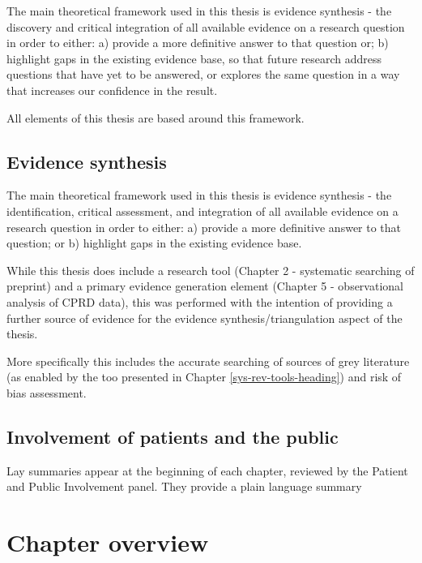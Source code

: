 \documentclass[a4paper, twoside]{templates/ociamthesis}
\begin{document}
The main theoretical framework used in this thesis is evidence synthesis - the discovery and critical integration of all available evidence on a research question in order to either: a) provide a more definitive answer to that question or; b) highlight gaps in the existing evidence base, so that future research address questions that have yet to be answered, or explores the same question in a way that increases our confidence in the result.

All elements of this thesis are based around this framework.

\hypertarget{evidence-synthesis}{%
\subsection{Evidence synthesis}\label{evidence-synthesis}}

The main theoretical framework used in this thesis is evidence synthesis - the identification, critical assessment, and integration of all available evidence on a research question in order to either: a) provide a more definitive answer to that question; or b) highlight gaps in the existing evidence base.

While this thesis does include a research tool (Chapter 2 - systematic searching of preprint) and a primary evidence generation element (Chapter 5 - observational analysis of CPRD data), this was performed with the intention of providing a further source of evidence for the evidence synthesis/triangulation aspect of the thesis.

More specifically this includes the accurate searching of sources of grey literature (as enabled by the too presented in Chapter \ref{sys-rev-tools-heading}) and risk of bias assessment.

\hypertarget{involvement-of-patients-and-the-public}{%
\subsection{Involvement of patients and the public}\label{involvement-of-patients-and-the-public}}

Lay summaries appear at the beginning of each chapter, reviewed by the Patient and Public Involvement panel. They provide a plain language summary

\hypertarget{chapter-overview}{%
\section{Chapter overview}\label{chapter-overview}}
\end{document}
